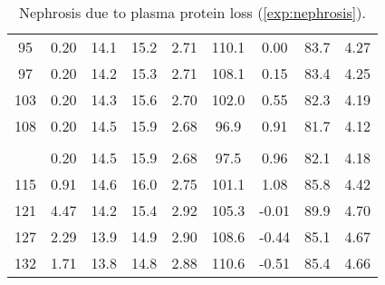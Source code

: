 \begin{table}
\begin{tabular}{ccccccccc}
    95 & 0.20 & 14.1 & 15.2 & 2.71 & 110.1 & 0.00 & 83.7 & 4.27 \\
    97 & 0.20 & 14.2 & 15.3 & 2.71 & 108.1 & 0.15 & 83.4 & 4.25 \\
    103 & 0.20 & 14.3 & 15.6 & 2.70 & 102.0 & 0.55 & 82.3 & 4.19 \\
    108 & 0.20 & 14.5 & 15.9 & 2.68 & 96.9 & 0.91 & 81.7 & 4.12 \\
    \addlinespace[\paramchangeskip]
    \multicolumn{9}{c}{\textit{DPO = 0.021}} \\
    \addlinespace[\paramchangeskip]
    109 & 0.20 & 14.5 & 15.9 & 2.68 & 97.5 & 0.96 & 82.1 & 4.18 \\
    115 & 0.91 & 14.6 & 16.0 & 2.75 & 101.1 & 1.08 & 85.8 & 4.42 \\
    121 & 4.47 & 14.2 & 15.4 & 2.92 & 105.3 & -0.01 & 89.9 & 4.70 \\
    127 & 2.29 & 13.9 & 14.9 & 2.90 & 108.6 & -0.44 & 85.1 & 4.67 \\
    132 & 1.71 & 13.8 & 14.8 & 2.88 & 110.6 & -0.51 & 85.4 & 4.66 \\
    \bottomrule
  \end{tabular}
  \caption{Nephrosis due to plasma protein loss (\autoref{exp:nephrosis}).}
  \label{tbl:nephrosis}
\end{table}
